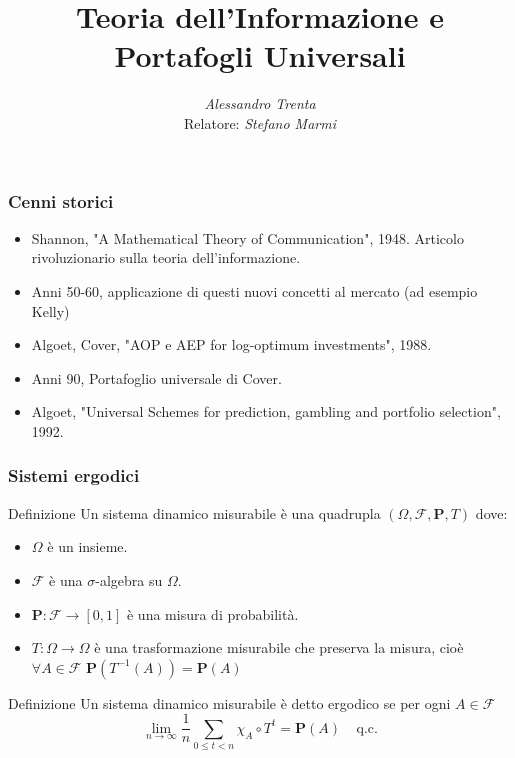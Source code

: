 \documentclass{beamer}
\title[Teoria dell'Informazione e Portafogli Universali]{Teoria dell'Informazione e Portafogli Universali} %
\author[Alessandro Trenta]{\emph{Alessandro Trenta}\\Relatore: \emph{Stefano Marmi}} %
\institute[SNS] %
{Scuola Normale Superiore \\ %
}
\date{} %
\theoremstyle{plain}
\theoremstyle{definition}
\theoremstyle{remark}
\newcommand{\F}{\mathcal{F}}
\newcommand{\Pro}{\mathbf{P}}
\begin{document}
\begin{frame}
\titlepage %
\end{frame}

\begin{frame}
	\tableofcontents
\end{frame}

\begin{frame}
	\frametitle{Cenni storici}
	\begin{itemize}
		\item Shannon, "A Mathematical Theory of Communication", 1948. Articolo rivoluzionario sulla teoria dell'informazione.
		\item Anni 50-60, applicazione di questi nuovi concetti al mercato (ad esempio Kelly) 
		\item Algoet, Cover, "AOP e AEP for log-optimum investments", 1988. 
		\item Anni 90, Portafoglio universale di Cover.
		\item Algoet, "Universal Schemes for prediction, gambling and portfolio selection", 1992.
	\end{itemize}
\end{frame}


\begin{frame}
	\frametitle{Sistemi ergodici}
	\begin{block}{Definizione}
		Un sistema dinamico misurabile è una quadrupla $(\Omega,\F,\Pro,T)$ dove:\begin{itemize}
			\item $\Omega$ è un insieme.
			\item $\F$ è una $\sigma$-algebra su $\Omega$.
			\item $\Pro:\F\rightarrow[0,1]$ è una misura di probabilità.
			\item $T:\Omega\rightarrow \Omega$ è una trasformazione misurabile che preserva la misura, cioè $\forall A\in \F$ $ \Pro(T^{-1}(A))=\Pro(A)$
		\end{itemize}
	\end{block}
	\begin{block}{Definizione}
		Un sistema dinamico misurabile è detto ergodico se per ogni $A\in \F$
		\begin{equation*}
		\lim\limits_{n\to\infty}\frac{1}{n}\sum_{0\leq t <n}\chi_A\circ T^t= \Pro(A)\;\;\;\; \text{q.c.}
		\end{equation*}
	\end{block}
\end{frame}
\end{document}

